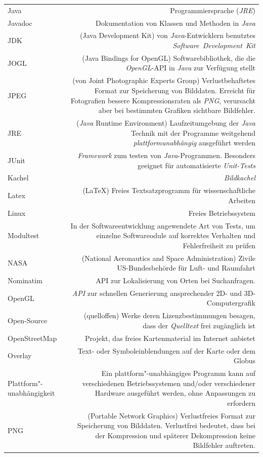 \documentclass[10pt]{scrreprt}
\newcommand{\textref}[1]{\mbox{\raisebox{0.1ex}{\small$\rightarrow$ }\textit{#1}}}
\begin{document}
\begin{longtabu}{L{0.35} R{1.65}}
Java & Programmiersprache (\textref{JRE})\\
Javadoc & Dokumentation von Klassen und Methoden in \textref{Java}\\
JDK & (Java Development Kit) von \textref{Java}-Entwicklern benutztes \textref{Software Development Kit}\\
JOGL & (Java Bindings for OpenGL) Softwarebibliothek, die die \textref{OpenGL}-API in \textref{Java} zur Verfügung stellt\\
JPEG & (von Joint Photographic Experts Group) Verlustbehaftetes Format zur Speicherung von Bilddaten. Erreicht für Fotografien bessere Kompressionsraten als \textref{PNG}, verursacht aber bei bestimmten Grafiken sichtbare Bildfehler.\\
JRE & (\textref{Java} Runtime Environment) Laufzeitumgebung der \textref{Java} Technik mit der Programme weitgehend \textref{plattformunabhängig} ausgeführt werden\\
JUnit & \textref{Framework} zum testen von \textref{Java}-Programmen. Besonders geeignet für automatisierte \textref{Unit-Tests}\\
Kachel & \textref{Bildkachel}\\
Latex & (\LaTeX) Freies Textsatzprogramm für wissenschaftliche Arbeiten\\
Linux & Freies Betriebssystem\\
Modultest & In der Softwareentwicklung angewendete Art von Tests, um einzelne Softwareodule auf korrektes Verhalten und Fehlerfreiheit zu prüfen\\
NASA & (National Aeronautics and Space Administration) Zivile US-Bundesbehörde für Luft- und Raumfahrt\\
Nominatim & API zur Lokalisierung von Orten bei Suchanfragen. \\
OpenGL & \textref{API} zur schnellen Generierung ansprechender 2D- und 3D-Computergrafik\\
Open-Source & (quelloffen) Werke deren Lizenzbestimmungen besagen, dass der \textref{Quelltext} frei zugänglich ist\\
OpenStreetMap & Projekt, das freies Kartenmaterial im Internet anbietet\\
Overlay & Text- oder Symboleinblendungen auf der Karte oder dem Globus\\
Plattform"-unabhängigkeit & Ein plattform"-unabhängiges Programm kann auf verschiedenen Betriebssystemen  und/oder verschiedener Hardware ausgeführt werden, ohne Anpassungen zu erfordern\\
PNG & (Portable Network Graphics) Verlustfreies Format zur Speicherung von Bilddaten. Verlustfrei bedeutet, dass bei der Kompression und späterer Dekompression keine Bildfehler auftreten.\\

\end{longtabu}
\end{document}
